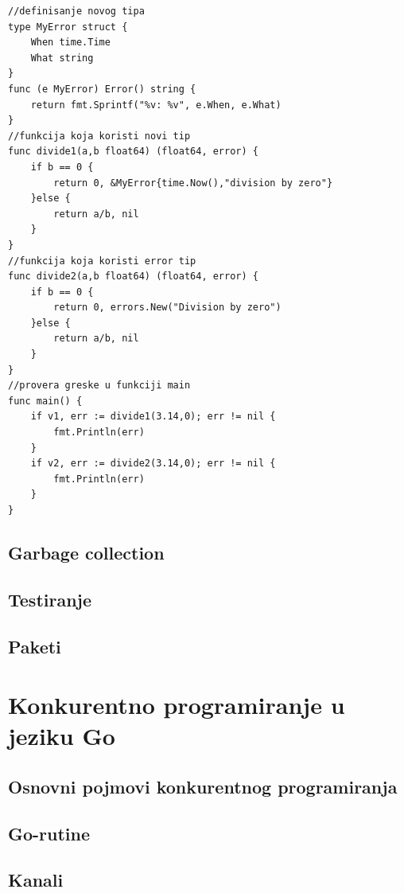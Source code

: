 \documentclass[12pt,oneside]{memoir}
\begin{document}
\begin{center}
\begin{lstlisting}[caption=Primer koji demonstrira upravljanje greškama, label={lst:error},  backgroundcolor=\color{background}]
//definisanje novog tipa
type MyError struct {
	When time.Time
	What string
}
func (e MyError) Error() string {
	return fmt.Sprintf("%v: %v", e.When, e.What)
}
//funkcija koja koristi novi tip
func divide1(a,b float64) (float64, error) {
	if b == 0 {
		return 0, &MyError{time.Now(),"division by zero"}
	}else {
		return a/b, nil
	}
}
//funkcija koja koristi error tip
func divide2(a,b float64) (float64, error) {
	if b == 0 {
		return 0, errors.New("Division by zero")
	}else {
		return a/b, nil
	}
}
//provera greske u funkciji main
func main() {
	if v1, err := divide1(3.14,0); err != nil {
		fmt.Println(err)				
	}
	if v2, err := divide2(3.14,0); err != nil {
		fmt.Println(err)			
	}
}
\end{lstlisting}
\end{center}
 
\section{Garbage collection}

\section{Testiranje}

\section{Paketi}


\chapter{Konkurentno programiranje u jeziku Go} \label{conc}

\section{Osnovni pojmovi konkurentnog programiranja}

\section{Go-rutine}

\section{Kanali} \label{chanel}
\end{document}
